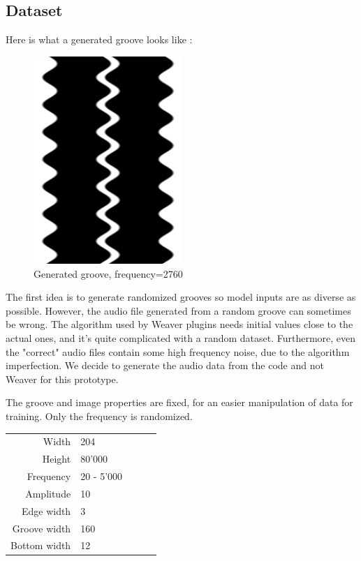 \documentclass[12pt, twoside]{article}
\begin{document}
\subsection{Dataset}
Here is what a generated groove looks like :
\begin{figure}
	\centering
	\includegraphics[width=0.5\textwidth]{../images/example_groove.png}
	\caption{Generated groove, frequency=2760}
	\label{gengroove}
\end{figure}
The first idea is to generate randomized grooves so model inputs are as diverse as possible. However, the audio file generated from a random groove can sometimes be wrong. The algorithm used by Weaver plugins needs initial values close to the actual ones, and it's quite complicated with a random dataset. Furthermore, even the "correct" audio files contain some high frequency noise, due to the algorithm imperfection. We decide to generate the audio data from the code and not Weaver for this prototype.

The groove and image properties are fixed, for an easier manipulation of data for training. Only the frequency is randomized.
\begin{table}
	\begin{tabular}{|r|l|lll}
		\cline{1-2}
		Width        & 204        &  &  &  \\ \cline{1-2}
		Height       & 80'000     &  &  &  \\ \cline{1-2}
		Frequency    & 20 - 5'000 &  &  &  \\ \cline{1-2}
		Amplitude    & 10         &  &  &  \\ \cline{1-2}
		Edge width   & 3          &  &  &  \\ \cline{1-2}
		Groove width & 160        &  &  &  \\ \cline{1-2}
		Bottom width & 12         &  &  &  \\ \cline{1-2}
	\end{tabular}
\end{table}
\end{document}
